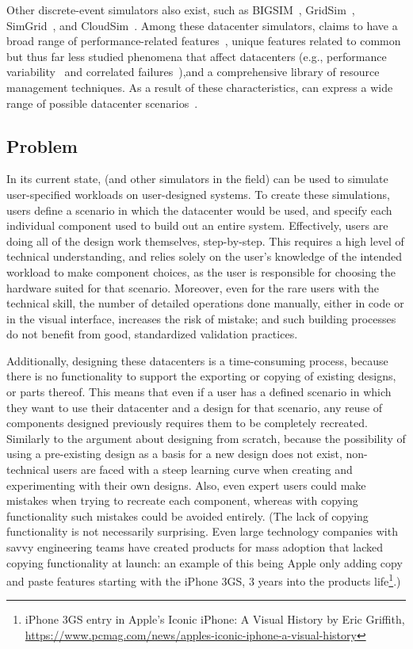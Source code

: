 \documentclass[11pt]{article}
\begin{document}
		Other discrete-event simulators also exist, such as BIGSIM~\cite{Zheng2004}, GridSim~\cite{Buyya2002}, SimGrid~\cite{Casanova2008}, and CloudSim~\cite{Calheiros2011}.
		Among these datacenter simulators, \opendc{} claims to have a broad range of performance-related features~\cite{Andreadis2018}, unique features related to common but thus far less studied phenomena that affect datacenters (e.g., performance variability~\cite{Iosup2011}\cite{Uta2020} and correlated failures~\cite{Yigitbasi2010}\cite{Javadi2013}),and a comprehensive library of resource management techniques.
		As a result of these characteristics, \opendc{} can express a wide range of possible datacenter scenarios~\cite{Versluis2018}\cite{Andreadis2018}\cite{Voinea2018}\cite{Beek2019}.
	
	\subsection{Problem}
		In its current state, \opendc{} (and other simulators in the field) can be used to simulate user-specified workloads on user-designed systems. 
		To create these simulations, users define a scenario in which the datacenter would be used, and specify each individual component used to build out an entire system. 
		Effectively, users are doing all of the design work themselves, step-by-step. 
		This requires a high level of technical understanding, and relies solely on the user's knowledge of the intended workload to make component choices, as the user is responsible for choosing the hardware suited for that scenario. 
		Moreover, even for the rare users with the technical skill, the number of detailed operations done manually, either in code or in the visual interface, increases the risk of mistake; and such building processes do not benefit from good, standardized validation practices.
		
		Additionally, designing these datacenters is a time-consuming process, because there is no functionality to support the exporting or copying of existing designs, or parts thereof.
		This means that even if a user has a defined scenario in which they want to use their datacenter and a design for that scenario, any reuse of components designed previously requires them to be completely recreated.
		Similarly to the argument about designing from scratch, because the possibility of using a pre-existing design as a basis for a new design does not exist, non-technical users are faced with a steep learning curve when creating and experimenting with their own designs. 
		Also, even expert users could make mistakes when trying to recreate each component, whereas with copying functionality such mistakes could be avoided entirely. 
		(The lack of copying functionality is not necessarily surprising. 
		Even large technology companies with savvy engineering teams have created products for mass adoption that lacked copying functionality at launch: an example of this being Apple only adding copy and paste features starting with the iPhone 3GS, 3 years into the products life\footnote{iPhone 3GS entry in Apple's Iconic iPhone: A Visual History by  Eric Griffith, \url{https://www.pcmag.com/news/apples-iconic-iphone-a-visual-history}}.)
		
\end{document}
